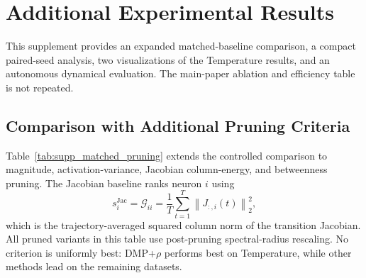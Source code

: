 %
% 
%

\clearpage
\appendix

\setcounter{table}{0}
\renewcommand{\thetable}{S\arabic{table}}
\setcounter{figure}{0}
\renewcommand{\thefigure}{S\arabic{figure}}

\section{Additional Experimental Results}
\label{app:additional_results}

This supplement provides an expanded matched-baseline comparison, a compact
paired-seed analysis, two visualizations of the Temperature results, and an
autonomous dynamical evaluation. The main-paper ablation and efficiency table
is not repeated.

\subsection{Comparison with Additional Pruning Criteria}
\label{app:additional_baselines}

Table~\ref{tab:supp_matched_pruning} extends the controlled comparison to
magnitude, activation-variance, Jacobian column-energy, and betweenness
pruning. The Jacobian baseline ranks neuron $i$ using
\[
s_i^{\mathrm{Jac}}
=
\mathcal{G}_{ii}
=
\frac{1}{T}\sum_{t=1}^{T}
\left\|J_{:,i}(t)\right\|_2^2,
\]
which is the trajectory-averaged squared column norm of the transition
Jacobian. All pruned variants in this table use post-pruning
spectral-radius rescaling. No criterion is uniformly best: DMP+$\rho$
performs best on Temperature, while other methods lead on the remaining
datasets.

